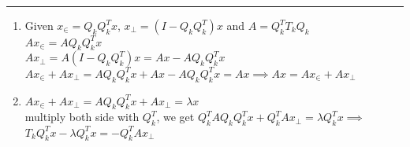 \documentclass[11pt]{article}
\begin{document}





\begin{quote}

\end{quote}
\hrule


\begin{solution}
\item  \begin{enumerate}
            \item Given $x_{\in} = Q_k Q_k^T x$, $x_\perp = (I - Q_k Q_k^T) x$ and $A = Q_k^T T_k Q_k$ \\
            $Ax_{\in} = A Q_k Q_k^T x$\\
            $Ax_\perp = A(I - Q_k Q_k^T)x = Ax - AQ_k Q_k^T x$\\
            $Ax_{\in} + Ax_{\perp} =  A Q_k Q_k^T x + Ax - AQ_k Q_k^T x = Ax \implies Ax = Ax_{\in} + Ax_{\perp}$ 
            
            \item $Ax_{\in} + Ax_{\perp} = A Q_k Q_k^T x + Ax_{\perp} = \lambda x$\\
            multiply both side with $Q_k^T$, we get 
            $Q_k^T A Q_k Q_k^T x + Q_k^TAx_{\perp} = \lambda Q_k^T x \implies$ \\
            $T_kQ_k^T x - \lambda Q_k^T x =  -Q_k^TAx_{\perp}$
            

\end{enumerate}
\end{solution}
\end{document}
